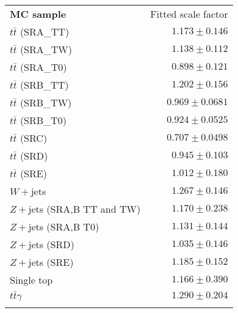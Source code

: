 \begin{tabular*}{\textwidth}{@{\extracolsep{\fill}}lr}
      \noalign{\smallskip}\hline\noalign{\smallskip}
      {\bf MC sample}           & Fitted scale factor        \\[-0.05cm]
      \noalign{\smallskip}\hline\noalign{\smallskip}
      $t\bar{t}$ (SRA\_TT) &   $1.173 \pm 0.146$              \\
      $t\bar{t}$ (SRA\_TW) &   $1.138 \pm 0.112$              \\
      $t\bar{t}$ (SRA\_T0) &   $0.898 \pm 0.121$              \\
      \noalign{\smallskip}\hline\noalign{\smallskip}
      $t\bar{t}$ (SRB\_TT) &   $1.202 \pm 0.156$              \\
      $t\bar{t}$ (SRB\_TW) &   $0.969 \pm 0.0681$              \\
      $t\bar{t}$ (SRB\_T0) &   $0.924 \pm 0.0525$              \\
      \noalign{\smallskip}\hline\noalign{\smallskip}
      $t\bar{t}$ (SRC) &   $0.707 \pm 0.0498$              \\
      $t\bar{t}$ (SRD) &   $0.945 \pm 0.103$              \\
      $t\bar{t}$ (SRE) &   $1.012 \pm 0.180$              \\
      \noalign{\smallskip}\hline\noalign{\smallskip}
      $W+$jets &   $1.267 \pm 0.146$              \\
      \noalign{\smallskip}\hline\noalign{\smallskip}
      $Z+$jets (SRA,B TT and TW) &   $1.170 \pm 0.238$              \\
      $Z+$jets (SRA,B T0) &   $1.131 \pm 0.144$              \\
      $Z+$jets (SRD) &   $1.035 \pm 0.146$              \\
      $Z+$jets (SRE) &   $1.185 \pm 0.152$              \\
      \noalign{\smallskip}\hline\noalign{\smallskip}
      Single top &   $1.166 \pm 0.390$              \\
      $t\bar{t}$$\gamma$ &   $1.290 \pm 0.204$              \\
      \noalign{\smallskip}\hline\noalign{\smallskip}
    \end{tabular*}
